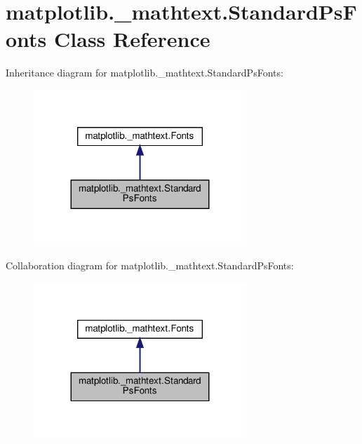 \hypertarget{classmatplotlib_1_1__mathtext_1_1StandardPsFonts}{}\section{matplotlib.\+\_\+mathtext.\+Standard\+Ps\+Fonts Class Reference}
\label{classmatplotlib_1_1__mathtext_1_1StandardPsFonts}


Inheritance diagram for matplotlib.\+\_\+mathtext.\+Standard\+Ps\+Fonts\+:
\nopagebreak
\begin{figure}[H]
\begin{center}
\leavevmode
\includegraphics[width=227pt]{classmatplotlib_1_1__mathtext_1_1StandardPsFonts__inherit__graph}
\end{center}
\end{figure}


Collaboration diagram for matplotlib.\+\_\+mathtext.\+Standard\+Ps\+Fonts\+:
\nopagebreak
\begin{figure}[H]
\begin{center}
\leavevmode
\includegraphics[width=227pt]{classmatplotlib_1_1__mathtext_1_1StandardPsFonts__coll__graph}
\end{center}
\end{figure}
